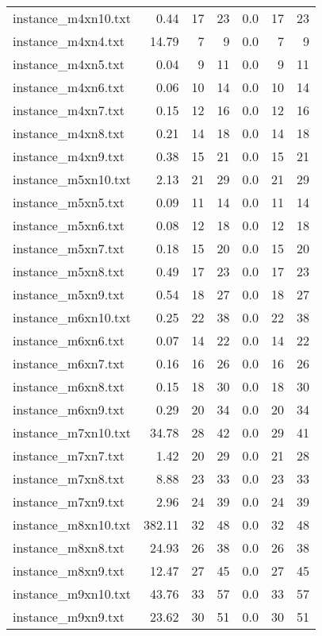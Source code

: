 \documentclass{article}
\begin{document}
\begin{center}
\begin{tabular}{lrrrrrr}
instance\_m4xn10.txt & 0.44 & 17 & 23
 & 0.0 & 17 & 23
\\
instance\_m4xn4.txt & 14.79 & 7 & 9
 & 0.0 & 7 & 9
\\
instance\_m4xn5.txt & 0.04 & 9 & 11
 & 0.0 & 9 & 11
\\
instance\_m4xn6.txt & 0.06 & 10 & 14
 & 0.0 & 10 & 14
\\
instance\_m4xn7.txt & 0.15 & 12 & 16
 & 0.0 & 12 & 16
\\
instance\_m4xn8.txt & 0.21 & 14 & 18
 & 0.0 & 14 & 18
\\
instance\_m4xn9.txt & 0.38 & 15 & 21
 & 0.0 & 15 & 21
\\
instance\_m5xn10.txt & 2.13 & 21 & 29
 & 0.0 & 21 & 29
\\
instance\_m5xn5.txt & 0.09 & 11 & 14
 & 0.0 & 11 & 14
\\
instance\_m5xn6.txt & 0.08 & 12 & 18
 & 0.0 & 12 & 18
\\
instance\_m5xn7.txt & 0.18 & 15 & 20
 & 0.0 & 15 & 20
\\
instance\_m5xn8.txt & 0.49 & 17 & 23
 & 0.0 & 17 & 23
\\
instance\_m5xn9.txt & 0.54 & 18 & 27
 & 0.0 & 18 & 27
\\
instance\_m6xn10.txt & 0.25 & 22 & 38
 & 0.0 & 22 & 38
\\
instance\_m6xn6.txt & 0.07 & 14 & 22
 & 0.0 & 14 & 22
\\
instance\_m6xn7.txt & 0.16 & 16 & 26
 & 0.0 & 16 & 26
\\
instance\_m6xn8.txt & 0.15 & 18 & 30
 & 0.0 & 18 & 30
\\
instance\_m6xn9.txt & 0.29 & 20 & 34
 & 0.0 & 20 & 34
\\
instance\_m7xn10.txt & 34.78 & 28 & 42
 & 0.0 & 29 & 41
\\
instance\_m7xn7.txt & 1.42 & 20 & 29
 & 0.0 & 21 & 28
\\
instance\_m7xn8.txt & 8.88 & 23 & 33
 & 0.0 & 23 & 33
\\
instance\_m7xn9.txt & 2.96 & 24 & 39
 & 0.0 & 24 & 39
\\
instance\_m8xn10.txt & 382.11 & 32 & 48
 & 0.0 & 32 & 48
\\
instance\_m8xn8.txt & 24.93 & 26 & 38
 & 0.0 & 26 & 38
\\
instance\_m8xn9.txt & 12.47 & 27 & 45
 & 0.0 & 27 & 45
\\
instance\_m9xn10.txt & 43.76 & 33 & 57
 & 0.0 & 33 & 57
\\
instance\_m9xn9.txt & 23.62 & 30 & 51
 & 0.0 & 30 & 51
\\
\hline\end{tabular}
\end{center}
\end{document}
